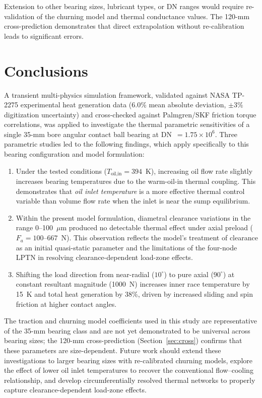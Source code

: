 \documentclass[applsci,article,submit,pdftex,moreauthors]{Definitions/mdpi}
\begin{document}
Extension to other bearing sizes, lubricant types, or DN ranges would require re-validation of the churning model and thermal conductance values. The 120-mm cross-prediction demonstrates that direct extrapolation without re-calibration leads to significant errors.


\section{Conclusions}
\label{sec:conclusion}

A transient multi-physics simulation framework, validated against NASA TP-2275 experimental heat generation data (6.0\% mean absolute deviation, $\pm 3\%$ digitization uncertainty) and cross-checked against Palmgren/SKF friction torque correlations, was applied to investigate the thermal parametric sensitivities of a single 35-mm bore angular contact ball bearing at DN~$= 1.75 \times 10^6$. Three parametric studies led to the following findings, which apply specifically to this bearing configuration and model formulation:

\begin{enumerate}
    \item Under the tested conditions ($T_{\text{oil,in}} = 394$~K), increasing oil flow rate slightly increases bearing temperatures due to the warm-oil-in thermal coupling. This demonstrates that \emph{oil inlet temperature} is a more effective thermal control variable than volume flow rate when the inlet is near the sump equilibrium.

    \item Within the present model formulation, diametral clearance variations in the range 0--100~$\mu$m produced no detectable thermal effect under axial preload ($F_a = 100$--$667$~N). This observation reflects the model's treatment of clearance as an initial quasi-static parameter and the limitations of the four-node LPTN in resolving clearance-dependent load-zone effects.

    \item Shifting the load direction from near-radial ($10^\circ$) to pure axial ($90^\circ$) at constant resultant magnitude (1000~N) increases inner race temperature by 15~K and total heat generation by 38\%, driven by increased sliding and spin friction at higher contact angles.
\end{enumerate}

The traction and churning model coefficients used in this study are representative of the 35-mm bearing class and are not yet demonstrated to be universal across bearing sizes; the 120-mm cross-prediction (Section~\ref{sec:cross}) confirms that these parameters are size-dependent. Future work should extend these investigations to larger bearing sizes with re-calibrated churning models, explore the effect of lower oil inlet temperatures to recover the conventional flow--cooling relationship, and develop circumferentially resolved thermal networks to properly capture clearance-dependent load-zone effects.
\end{document}
